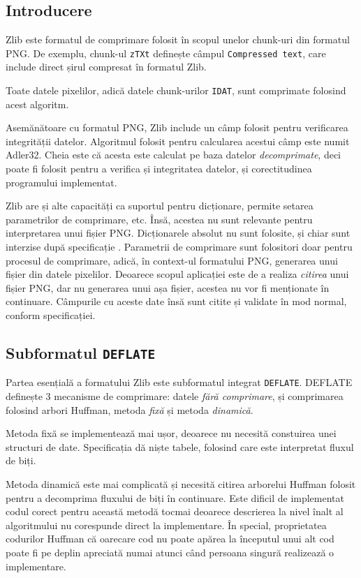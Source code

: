\documentclass[a4paper,12pt]{report}
\begin{document}
\subsection{Introducere}

Zlib este formatul de comprimare folosit în scopul unelor chunk-uri din formatul \ac{PNG}.
De exemplu, chunk-ul \texttt{zTXt} definește câmpul \texttt{Compressed text},
care include direct șirul compresat în formatul Zlib.

Toate datele pixelilor, adică datele chunk-urilor \texttt{IDAT}, sunt comprimate folosind acest algoritm.

Asemănătoare cu formatul \ac{PNG}, Zlib include un câmp folosit pentru verificarea integrității datelor.
Algoritmul folosit pentru calcularea acestui câmp este numit Adler32.
Cheia este că acesta este calculat pe baza datelor \textit{decomprimate},
deci poate fi folosit pentru a verifica și integritatea datelor, și corectitudinea programului implementat.

Zlib are și alte capacități ca suportul pentru dicționare, permite setarea parametrilor de comprimare, etc.
Însă, acestea nu sunt relevante pentru interpretarea unui fișier \ac{PNG}.
Dicționarele absolut nu sunt folosite, și chiar sunt interzise după specificație \cite{png_spec_chapter_deflate}.
Parametrii de comprimare sunt folositori doar pentru procesul de comprimare,
adică, în context-ul formatului \ac{PNG}, generarea unui fișier din datele pixelilor.
Deoarece scopul aplicației este de a realiza \textit{citirea} unui fișier \ac{PNG},
dar nu generarea unui așa fișier, acestea nu vor fi menționate în continuare.
Câmpurile cu aceste date însă sunt citite și validate în mod normal, conform specificației.

\subsection{Subformatul \texttt{DEFLATE}}

Partea esențială a formatului Zlib este subformatul integrat \texttt{DEFLATE}.
DEFLATE definește 3 mecanisme de comprimare: datele \textit{fără comprimare},
și comprimarea folosind arbori Huffman, metoda \textit{fixă} și metoda \textit{dinamică}.

Metoda fixă se implementează mai ușor, deoarece nu necesită constuirea unei structuri de date.
Specificația dă niște tabele, folosind care este interpretat fluxul de biți.

Metoda dinamică este mai complicată și necesită citirea arborelui Huffman
folosit pentru a decomprima fluxului de biți în continuare.
Este dificil de implementat codul corect pentru această metodă tocmai deoarece descrierea
la nivel înalt al algoritmului nu corespunde direct la implementare.
În special, proprietatea codurilor Huffman că oarecare cod nu poate apărea
la începutul unui alt cod poate fi pe deplin apreciată numai atunci
când persoana singură realizează o implementare.
\end{document}
